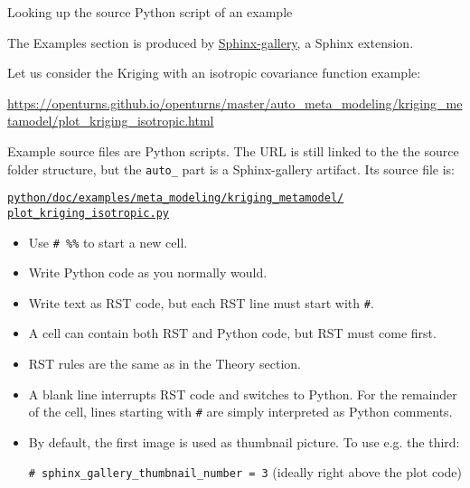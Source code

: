 \documentclass[8pt]{beamer}
\begin{document}
\begin{frame}{Looking up the source Python script of an example}

The Examples section is produced by \href{https://sphinx-gallery.github.io/stable/index.html}{\alert{Sphinx-gallery}}, a Sphinx extension.

Let us consider the \alert{Kriging with an isotropic covariance function} example:

\url{https://openturns.github.io/openturns/master/auto_meta_modeling/kriging_metamodel/plot_kriging_isotropic.html}

Example source files are \alert{Python scripts}.
The URL is still linked to the the source folder structure,
but the \texttt{auto\_} part is a Sphinx-gallery artifact. Its source file is:

\href{https://github.com/openturns/openturns/blob/master/python/doc/examples/meta_modeling/kriging_metamodel/plot_kriging_isotropic.py}{\texttt{python/doc/examples/meta\_modeling/kriging\_metamodel/\\plot\_kriging\_isotropic.py}}

\begin{itemize}
    \item Use \alert{\texttt{\# \%\%}} to start a \alert{new cell}.
    \item Write \alert{Python code} as you \alert{normally} would.
    \item Write \alert{text as RST code}, but each RST line must start with \alert{\texttt{\#}}.
    \item A cell can contain both RST and Python code, but \alert{RST must come first}.  
    \item \alert{RST rules are the same} as in the Theory section.
    \item A \alert{blank line} interrupts RST code and \alert{switches to Python}. For the remainder of the cell, lines starting with \alert{\texttt{\#}} are simply interpreted as Python comments.
    \item By default, the first image is used as \alert{thumbnail picture}. To use e.g. the third: %

    \texttt{\# sphinx\_gallery\_thumbnail\_number = 3} (ideally right above the plot code)
\end{itemize}

\end{frame}
\end{document}
